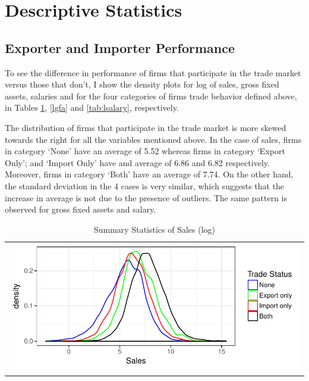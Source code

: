 \documentclass[12pt]{article}
\begin{document}
\begin{center}

\end{center}
\section{Descriptive Statistics}\label{sec:desc}
\subsection{Exporter and Importer Performance}
To see the difference in performance of firms that participate in the trade market
versus those that don't, I show the density plots for log of sales, gross fixed assets,
salaries and for the four categories of 
firms trade behavior defined above, in  
Tables \ref{lsales}, \ref{lgfa} and \ref{tab:lsalary}, respectively. 

The distribution of firms that participate in the trade market is more skewed towards the right for all the
variables mentioned above. In the case of sales, firms in category
`None' have an average of 5.52 whereas firms in category `Export Only';
and `Import Only' have and average  of 6.86 and
6.82 respectively. Moreover, firms in category `Both' have an average
of  7.74.  On the other hand, the standard deviation in the 4 
cases is very similar, which suggests that the increase in average is
not due to the presence of outliers. The same pattern is observed for
gross fixed assets and salary.  

\begin{center}
\begin{table}[H]
\caption{Summary Statistics of Sales (log)}
\label{lsales}
\begin{tabular}{c}
 \includegraphics{./PICS/denslsales.pdf}   \\ 
   \\  
\end{tabular}
\end{table}
\end{center}
\end{document}

